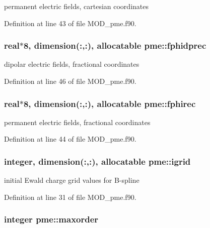 permanent electric fields, cartesian coordinates 



Definition at line 43 of file M\-O\-D\-\_\-pme.\-f90.

\hypertarget{classpme_a78223e8e44ba3091095218d421ed4c61}{
\subsubsection[{fphidprec}]{\setlength{\rightskip}{0pt plus 5cm}real$\ast$8, dimension(\-:,\-:), allocatable pme\-::fphidprec}}\label{classpme_a78223e8e44ba3091095218d421ed4c61}


dipolar electric fields, fractional coordinates 



Definition at line 46 of file M\-O\-D\-\_\-pme.\-f90.

\hypertarget{classpme_a3c1e3e7a8d7e5a22e4c8bed26520f761}{
\subsubsection[{fphirec}]{\setlength{\rightskip}{0pt plus 5cm}real$\ast$8, dimension(\-:,\-:), allocatable pme\-::fphirec}}\label{classpme_a3c1e3e7a8d7e5a22e4c8bed26520f761}


permanent electric fields, fractional coordinates 



Definition at line 44 of file M\-O\-D\-\_\-pme.\-f90.

\hypertarget{classpme_abb9eb9e37b058bcbce7c025c3c7ae206}{
\subsubsection[{igrid}]{\setlength{\rightskip}{0pt plus 5cm}integer, dimension(\-:,\-:), allocatable pme\-::igrid}}\label{classpme_abb9eb9e37b058bcbce7c025c3c7ae206}


initial Ewald charge grid values for B-\/spline 



Definition at line 31 of file M\-O\-D\-\_\-pme.\-f90.

\hypertarget{classpme_a52bd2839e2a18ce15733259a32c2bc3f}{
\subsubsection[{maxorder}]{\setlength{\rightskip}{0pt plus 5cm}integer pme\-::maxorder}}\label{classpme_a52bd2839e2a18ce15733259a32c2bc3f}


